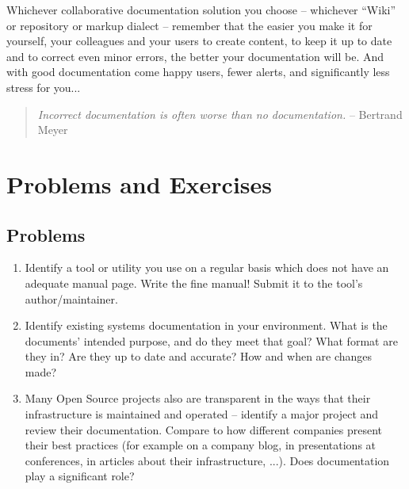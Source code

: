 Whichever collaborative documentation solution you
choose -- whichever ``Wiki'' or repository
or markup dialect -- remember that the easier you make
it for yourself, your colleagues and your users to
create content, to keep it up to date and to correct
even minor errors, the better your documentation will
be.  And with good documentation come happy users,
fewer alerts, and significantly less stress for you...

\begin{quote}
{\em Incorrect documentation is often worse than no documentation.} --
Bertrand Meyer
\end{quote}


\vfill
\pagebreak

\chapter*{Problems and Exercises}
\section*{Problems}

\begin{enumerate}
\item
Identify a tool or utility you use on a regular basis which does not have
an adequate manual page.  Write the fine manual!  Submit it to the tool's
author/maintainer.

\item
Identify existing systems documentation in your environment.  What is the
documents' intended purpose, and do they meet that goal?  What format are
they in?  Are they up to date and accurate?  How and when are changes
made?

\item
Many Open Source projects also are transparent in the ways that their
infrastructure is maintained and operated -- identify a major project and
review their documentation.  Compare to how different companies present
their best practices (for example on a company blog, in presentations at
conferences, in articles about their infrastructure, ...).  Does
documentation play a significant role?

\end{enumerate}

\pagebreak

